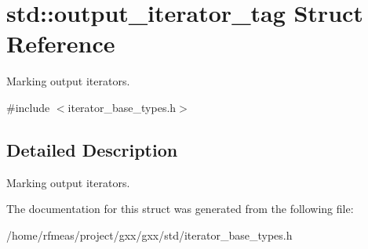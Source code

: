 \hypertarget{structstd_1_1output__iterator__tag}{}\section{std\+:\+:output\+\_\+iterator\+\_\+tag Struct Reference}
\label{structstd_1_1output__iterator__tag}


Marking output iterators.  




{\ttfamily \#include $<$iterator\+\_\+base\+\_\+types.\+h$>$}



\subsection{Detailed Description}
Marking output iterators. 

The documentation for this struct was generated from the following file\+:\begin{DoxyCompactItemize}
\item 
/home/rfmeas/project/gxx/gxx/std/iterator\+\_\+base\+\_\+types.\+h\end{DoxyCompactItemize}
